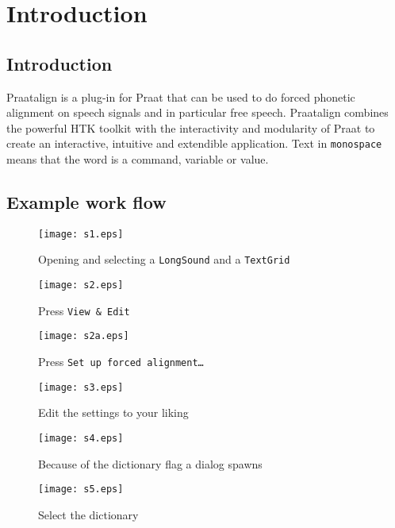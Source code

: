 
\cleardoublepage
\maketitle
\setcounter{page}{1}
\tableofcontents
\chapter{Introduction}
\section{Introduction}
Praatalign is a plug-in for Praat that can be used to do forced phonetic
alignment on speech signals and in particular free speech. Praatalign combines
the powerful HTK toolkit with the interactivity and modularity of Praat to
create an interactive, intuitive and extendible application. Text in
\texttt{monospace} means that the word is a command, variable or value.

\section{Example work flow}
\begin{figure}[H]
	\centering
	\texttt{[image: s1.eps]}
	\caption{Opening and selecting a \texttt{LongSound} and a \texttt{TextGrid}}
\end{figure}

\begin{figure}[H]
	\centering
	\texttt{[image: s2.eps]}
	\caption{Press \texttt{View \& Edit}}
\end{figure}

\begin{figure}[H]
	\centering
	\texttt{[image: s2a.eps]}
	\caption{Press \texttt{Set up forced alignment\ldots}}
\end{figure}

\begin{figure}[H]
	\centering
	\texttt{[image: s3.eps]}
	\caption{Edit the settings to your liking}
\end{figure}

\begin{figure}[H]
	\centering
	\texttt{[image: s4.eps]}
	\caption{Because of the dictionary flag a dialog spawns}
\end{figure}

\begin{figure}[H]
	\centering
	\texttt{[image: s5.eps]}
	\caption{Select the dictionary}
\end{figure}

